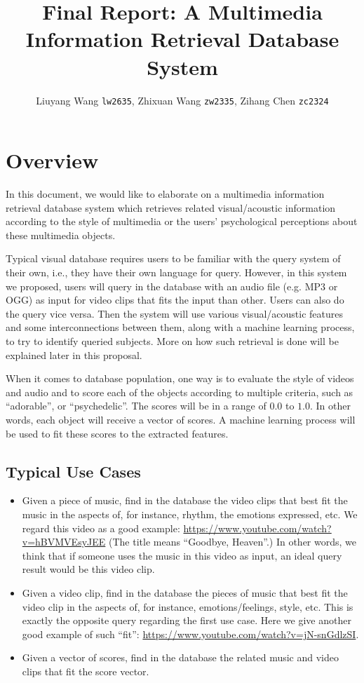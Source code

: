 \documentclass{report}
\title{Final Report: A Multimedia Information Retrieval Database System}
\author{Liuyang Wang \texttt{lw2635}, Zhixuan Wang \texttt{zw2335}, Zihang Chen \texttt{zc2324}}
\begin{document}
\maketitle
\tableofcontents

\chapter{Overview}

In this document, we would like to elaborate on a multimedia information retrieval database system which retrieves related visual/acoustic information according to the style of multimedia or the users' psychological perceptions about these multimedia objects.

Typical visual database requires users to be familiar with the query system of their own, i.e., they have their own language for query. However, in this system we proposed, users will query in the database with an audio file (e.g. MP3 or OGG) as input for video clips that fits the input than other. Users can also do the query vice versa. Then the system will use various visual/acoustic features and some interconnections between them, along with a machine learning process, to try to identify queried subjects. More on how such retrieval is done will be explained later in this proposal.

When it comes to database population, one way is to evaluate the style of videos and audio and to score each of the objects according to multiple criteria, such as ``adorable'', or ``psychedelic''. The scores will be in a range of $0.0$ to $1.0$. In other words, each object will receive a vector of scores. A machine learning process will be used to fit these scores to the extracted features.

\section{Typical Use Cases}

\begin{itemize}
\item Given a piece of music, find in the database the video clips that best fit the music in the aspects of, for instance, rhythm, the emotions expressed, etc. We regard this video as a good example: \url{https://www.youtube.com/watch?v=hBVMVEsyJEE} (The title means ``Goodbye, Heaven''.) In other words, we think that if someone uses the music in this video as input, an ideal query result would be this video clip.
\item Given a video clip, find in the database the pieces of music that best fit the video clip in the aspects of, for instance, emotions/feelings, style, etc. This is exactly the opposite query regarding the first use case. Here we give another good example of such ``fit'': \url{https://www.youtube.com/watch?v=jN-snGdlzSI}.
\item Given a vector of scores, find in the database the related music and video clips that fit the score vector.
\end{itemize}
\end{document}

